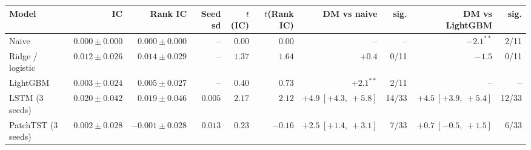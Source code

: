 \begin{tabular}{lrrrrrrrrr}
\toprule
Model & IC & Rank IC & Seed sd & $t$(IC) & $t$(Rank IC) & DM vs naive & sig. & DM vs LightGBM & sig. \\
\midrule
Naive & $0.000 \pm 0.000$ & $0.000 \pm 0.000$ & -- & $0.00$ & $0.00$ & -- & -- & $-2.1^{**}$ & 2/11 \\
Ridge / logistic & $0.012 \pm 0.026$ & $0.014 \pm 0.029$ & -- & $1.37$ & $1.64$ & $+0.4$ & 0/11 & $-1.5$ & 0/11 \\
LightGBM & $0.003 \pm 0.024$ & $0.005 \pm 0.027$ & -- & $0.40$ & $0.73$ & $+2.1^{**}$ & 2/11 & -- & -- \\
LSTM (3 seeds) & $0.020 \pm 0.042$ & $0.019 \pm 0.046$ & $0.005$ & $2.17$ & $2.12$ & $+4.9\ [+4.3,\ +5.8]$ & 14/33 & $+4.5\ [+3.9,\ +5.4]$ & 12/33 \\
PatchTST (3 seeds) & $0.002 \pm 0.028$ & $-0.001 \pm 0.028$ & $0.013$ & $0.23$ & $-0.16$ & $+2.5\ [+1.4,\ +3.1]$ & 7/33 & $+0.7\ [-0.5,\ +1.5]$ & 6/33 \\
\bottomrule
\end{tabular}
